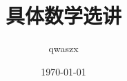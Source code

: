 \documentclass[11pt]{article}
\title{具体数学选讲}
\author{qwaszx}
\date{\today}
\begin{document}
\begin{frame}
  \titlepage
\end{frame}












\end{document}
